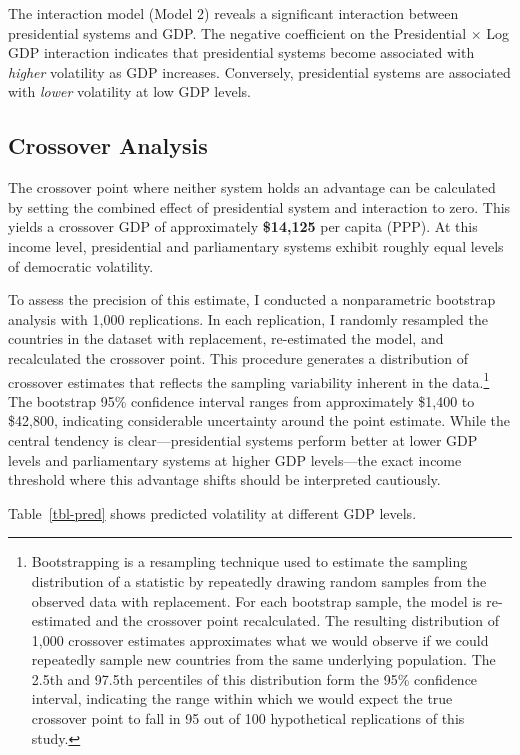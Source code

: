 \documentclass[
  letterpaper,
  DIV=11,
  numbers=noendperiod]{scrartcl}
\begin{document}
The interaction model (Model 2) reveals a significant interaction
between presidential systems and GDP. The negative coefficient on the
Presidential \(\times\) Log GDP interaction indicates that presidential
systems become associated with \emph{higher} volatility as GDP
increases. Conversely, presidential systems are associated with
\emph{lower} volatility at low GDP levels.

\subsection{Crossover Analysis}\label{crossover-analysis}

The crossover point where neither system holds an advantage can be
calculated by setting the combined effect of presidential system and
interaction to zero. This yields a crossover GDP of approximately
\textbf{\$14,125} per capita (PPP). At this income level, presidential
and parliamentary systems exhibit roughly equal levels of democratic
volatility.

To assess the precision of this estimate, I conducted a nonparametric
bootstrap analysis with 1,000 replications. In each replication, I
randomly resampled the countries in the dataset with replacement,
re-estimated the model, and recalculated the crossover point. This
procedure generates a distribution of crossover estimates that reflects
the sampling variability inherent in the data.\footnote{Bootstrapping is
  a resampling technique used to estimate the sampling distribution of a
  statistic by repeatedly drawing random samples from the observed data
  with replacement. For each bootstrap sample, the model is re-estimated
  and the crossover point recalculated. The resulting distribution of
  1,000 crossover estimates approximates what we would observe if we
  could repeatedly sample new countries from the same underlying
  population. The 2.5th and 97.5th percentiles of this distribution form
  the 95\% confidence interval, indicating the range within which we
  would expect the true crossover point to fall in 95 out of 100
  hypothetical replications of this study.} The bootstrap 95\%
confidence interval ranges from approximately \$1,400 to \$42,800,
indicating considerable uncertainty around the point estimate. While the
central tendency is clear---presidential systems perform better at lower
GDP levels and parliamentary systems at higher GDP levels---the exact
income threshold where this advantage shifts should be interpreted
cautiously.

Table~\ref{tbl-pred} shows predicted volatility at different GDP levels.
\end{document}
